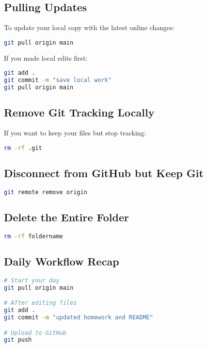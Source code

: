 \documentclass[11pt,letterpaper]{article}
\begin{document}
\subsection{Pulling Updates}
To update your local copy with the latest online changes:
\begin{lstlisting}[language=bash]
git pull origin main
\end{lstlisting}

If you made local edits first:
\begin{lstlisting}[language=bash]
git add .
git commit -m "save local work"
git pull origin main
\end{lstlisting}


\subsection{Remove Git Tracking Locally}
If you want to keep your files but stop tracking:
\begin{lstlisting}[language=bash]
rm -rf .git
\end{lstlisting}

\subsection{Disconnect from GitHub but Keep Git}
\begin{lstlisting}[language=bash]
git remote remove origin
\end{lstlisting}

\subsection{Delete the Entire Folder}
\begin{lstlisting}[language=bash]
rm -rf foldername
\end{lstlisting}


\subsection{Daily Workflow Recap}
\begin{lstlisting}[language=bash]
# Start your day
git pull origin main

# After editing files
git add .
git commit -m "updated homework and README"

# Upload to GitHub
git push
\end{lstlisting}
\end{document}
